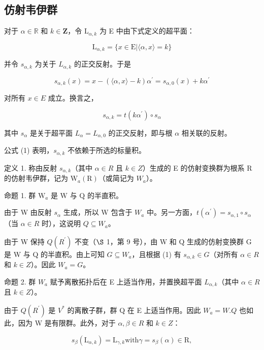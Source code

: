 \subsection{仿射韦伊群}

对于 \(\alpha \in \mathbb{R}\) 和 \(k\in \mathbf{Z}\)，令 \(\mathrm{L}_{\alpha ,k}\) 为 E 中由下式定义的超平面：

\[
\mathrm{L} _ {\alpha , k} = \{x \in \mathrm{E} | \langle \alpha , x \rangle = k \}
\]

并令 \(s_{\alpha, k}\) 为关于 \(L_{\alpha, k}\) 的正交反射。于是

\[
s _ {\alpha , k} (x) = x - (\langle \alpha , x \rangle - k) \alpha^ {\prime} = s _ {\alpha , 0} (x) + k \alpha^ {\prime}
\]

对所有 \(x \in E\) 成立。换言之，

\[
s _ {\alpha , k} = t (k \alpha^ {\prime}) \circ s _ {\alpha}\tag{1}
\]

其中 \(s_{\alpha}\) 是关于超平面 \(L_{\alpha} = L_{\alpha,0}\) 的正交反射，即与根 \(\alpha\) 相关联的反射。

公式 (1) 表明，\(s_{\alpha, k}\) 不依赖于所选的标量积。

定义 1. 称由反射 \(s_{\alpha,k}\)（其中 \(\alpha \in R\) 且 \(k \in Z\)）生成的 E 的仿射变换群为根系 R 的仿射韦伊群，记为 \(\mathrm{W}_{a}(\mathrm{R})\)（或简记为 \(W_{a}\)）。

命题 1. 群 \(\mathrm{W}_a\) 是 \(\mathrm{W}\) 与 \(\mathrm{Q}\) 的半直积。

由于 W 由反射 \(s_{\alpha}\) 生成，所以 W 包含于 \(W_{a}\) 中。另一方面，\(t(\alpha^{\prime}) = s_{\alpha,1} \circ s_{\alpha}\)（当 \(\alpha \in R\) 时），这说明 \(Q \subseteq W_{a}\)。

由于 W 保持 \(Q(R^{\prime})\) 不变（\(\S\) 1，第 9 号），由 W 和 Q 生成的仿射变换群 G 是 W 与 Q 的半直积。由上可知 \(G \subseteq W_{a}\)，且根据 (1) 有 \(s_{\alpha,k} \in G\)（对所有 \(\alpha \in R\) 和 \(k \in Z\)）。因此 \(W_{a} = G\)。

命题 2. 群 \(W_{a}\) 赋予离散拓扑后在 E 上适当作用，并置换超平面 \(L_{\alpha,k}\)（其中 \(\alpha \in R\) 且 \(k \in Z\)）。

由于 \(Q(R^{\prime})\) 是 \(V^{*}\) 的离散子群，群 Q 在 E 上适当作用。因此 \(W_{a} = W.Q\) 也如此，因为 W 是有限群。此外，对于 \(\alpha, \beta \in R\) 和 \(k \in Z\)：

\[
s _ {\beta} (\mathrm{L} _ {\alpha , k}) = \mathrm{L} _ {\gamma , k} \text {with} \gamma = s _ {\beta} (\alpha) \in \mathrm{R},
\]


